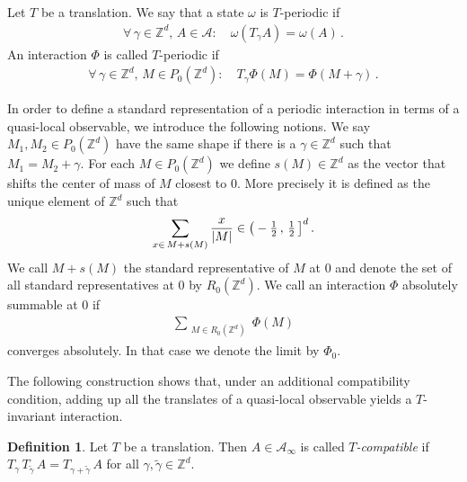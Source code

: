 \documentclass[a4paper]{article}
\renewcommand{\Phi}{\varPhi}
\newcommand{\g}{\gamma}
\newcommand{\w}{\omega}
\newcommand{\Z}{\mathbb{Z}}
\newcommand{\mA}{\mathcal{A}}
\DeclarePairedDelimiter\abs{\lvert}{\rvert}
\theoremstyle{plain}
\theoremstyle{definition}
\newtheorem{definition}[theorem]{Definition}
\theoremstyle{remark}
\renewcommand{\(}{\left(}
\renewcommand{\)}{\right)}
\begin{document}
    Let $T$ be a translation. We say that a state $\w$ is $T$-periodic if
\begin{align*}
\forall \, \gamma \in \Z^d, \, A\in\mathcal{A}:\quad
    \w(T_\gamma A) = \w(A)\, .
\end{align*}
    An interaction $\Phi$ is called $T$-periodic if
    \begin{align*}
\forall \, \gamma \in \Z^d, \, M\in P_0(\Z^d):\quad        T_{\g} \Phi(M) = \Phi(M+\g)\,. 
    \end{align*}




\medskip





In order to define a standard representation of a periodic interaction in terms of a quasi-local observable, we introduce the following notions. 
    We say $M_1,M_2 \in P_0(\Z^d)$ have the same shape if there is a $\gamma\in \Z^d$ such that $M_1 = M_2 +\g$. For each $M\in P_0(\Z^d)$ we define $s(M) \in \Z^d$ as the vector that shifts the center of mass of $M$ closest to $0$. More precisely it is defined as the unique element of $\Z^d$ such that
    \begin{align}\label{def: shape}
         \sum_{x\in \, M + s(M)} \frac{x}{\abs{M}} \in  {\big ( }-\tfrac{1}{2}\,,\,\tfrac{1}{2}\, {\big]}^d \, .
    \end{align}
    We call $M+s(M)$ the standard representative of $M$ at $0$ and denote the set of all standard representatives at $0$ by $R_0(\Z^d)$.
We call an interaction $\Phi$ absolutely summable at $0$ if 
    \begin{align*}
        \sum\limits_{\substack{M\in R_0(\Z^d)}}  \Phi(M)
    \end{align*}
    converges absolutely. In that case   we denote the limit by $\Phi_0$.


The following construction shows that, under an additional compatibility condition, adding up all the translates of a quasi-local observable yields a $T$-invariant interaction.

\medskip

\begin{definition}
    Let $T$ be a translation. Then $A\in \mA_\infty$ is called \emph{$T$-compatible} if $T_\g\, T_{\tilde\g} \,A = T_{\g+\tilde\g}\, A $ for all $\g, \tilde\g \in \Z^d $.
\end{definition}

\medskip
\end{document}
